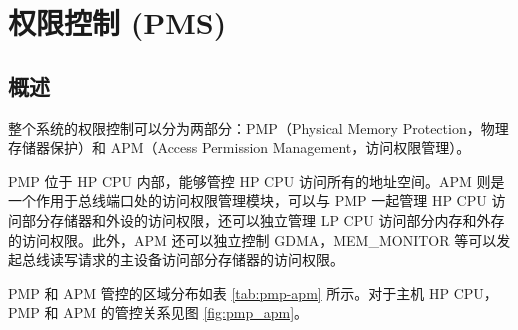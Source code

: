 \documentclass[main\_\_CN.tex]{subfiles}
\begin{document}

\ifglobal
\else
    \listoftodos
    {\let\clearpage\relax \listofdonetodos}
    \tableofcontents
\fi




\hypertarget{permctrl}{}
\chapter{权限控制 (PMS)}
\label{mod:permctrl}

\section{概述}

\chipname{} 整个系统的权限控制可以分为两部分：PMP（Physical Memory Protection，物理存储器保护）和 APM（Access Permission Management，访问权限管理）。

PMP 位于 HP CPU 内部，能够管控 HP CPU 访问所有的地址空间。APM 则是一个作用于总线端口处的访问权限管理模块，可以与 PMP 一起管理 HP CPU 访问部分存储器和外设的访问权限，还可以独立管理 LP CPU 访问部分内存和外存的访问权限。此外，APM 还可以独立控制 GDMA，MEM\_MONITOR 等可以发起总线读写请求的主设备访问部分存储器的访问权限。

PMP 和 APM 管控的区域分布如表 \ref{tab:pmp-apm} 所示。对于主机 HP CPU，PMP 和 APM 的管控关系见图 \ref{fig:pmp_apm}。
\end{document}
